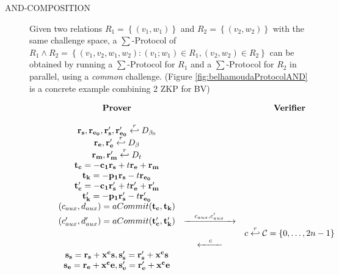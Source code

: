 \begin{description}
\item[AND-COMPOSITION] Given two relations $R_1 = \left\{ (v_1,w_1) \right\}$
  and $R_2 = \left\{ (v_2, w_2) \right\}$ with the same challenge space, a
  $\sum$-Protocol of
  $R_1 \wedge R_2 = \left\{ (v_1, v_2, w_1, w_2): (v_1;w_1) \in R_1, (v_2,w_2)
    \in R_2\right\}$ can be obtained by running a $\sum$-Protocol for $R_1$ and
  a $\sum$-Protocol for $R_2$ in parallel, using a \emph{common} challenge.
  (Figure \ref{fig:belhamoudaProtocolAND} is a concrete example combining 2 ZKP for BV)
  
  \begin{figure}[h!]
    \centering
    \begin{equation*}
      \begin{array}{c c c}
        \text{\textbf{Prover}} & & \text{\textbf{Verifier}} \\
        \\
        \mathbf{r_s,r_{e_0},r'_{s},r'_{e_{0}}} \stackrel{r}{\hookleftarrow} D_{\beta_0} & & \\
        \mathbf{r_e,r'_{e}} \stackrel{r}{\hookleftarrow} D_{\beta} & & \\
        \mathbf{r_m,r'_{m}} \stackrel{r}{\hookleftarrow} D_{t} & & \\
        \mathbf{t_c} = \mathbf{-c_1r_s} + t\mathbf{r_e + r_m} & & \\
        \mathbf{t_k} = \mathbf{-p_1r_s} - t\mathbf{r_{e_0}} & & \\
        \mathbf{t'_c} = \mathbf{-c_1r'_s} + t\mathbf{r'_e + r'_m} & & \\
        \mathbf{t'_k} = \mathbf{-p_1r'_s} - t\mathbf{r'_{e_0}} & & \\
        (c_{aux}, d_{aux}) = aCommit(\mathbf{t_c,t_k}) & & \\
        (c'_{aux}, d'_{aux}) = aCommit(\mathbf{t'_c,t'_k}) &
                                                         \xrightarrow{\hspace{1em}c_{aux},c'_{aux}\hspace{1em}} & \\
                               & & c \stackrel{r}{\hookleftarrow} \mathcal{C} = \left\{ 0,\dots, 2n -1  \right\}\\
                               &  \xleftarrow{\hspace{1em}c\hspace{1em}} & \\
        \mathbf{s_s = r_s + x^cs},\mathbf{s'_s = r'_s + x^cs} & & \\
        \mathbf{s_e = r_e + x^ce},\mathbf{s'_e = r'_e + x^ce} & & \\

\end{array}
\end{equation*}
\end{figure}
\end{description}
